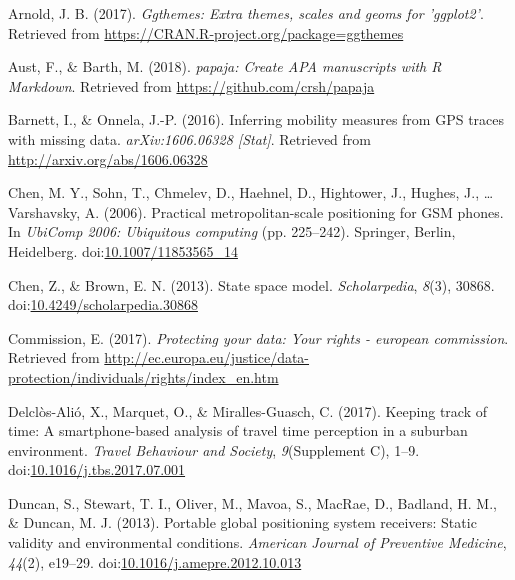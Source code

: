 \documentclass[man]{apa6}
\theoremstyle{definition}
\theoremstyle{definition}
\theoremstyle{definition}
\theoremstyle{remark}
\begin{document}
\begingroup
\setlength{\parindent}{-0.5in} \setlength{\leftskip}{0.5in}

\hypertarget{refs}{}
\hypertarget{ref-R-ggthemes}{}
Arnold, J. B. (2017). \emph{Ggthemes: Extra themes, scales and geoms for
'ggplot2'}. Retrieved from
\url{https://CRAN.R-project.org/package=ggthemes}

\hypertarget{ref-R-papaja}{}
Aust, F., \& Barth, M. (2018). \emph{papaja: Create APA manuscripts with
R Markdown}. Retrieved from \url{https://github.com/crsh/papaja}

\hypertarget{ref-barnett_inferring_2016}{}
Barnett, I., \& Onnela, J.-P. (2016). Inferring mobility measures from
GPS traces with missing data. \emph{arXiv:1606.06328 {[}Stat{]}}.
Retrieved from \url{http://arxiv.org/abs/1606.06328}

\hypertarget{ref-chen_practical_2006}{}
Chen, M. Y., Sohn, T., Chmelev, D., Haehnel, D., Hightower, J., Hughes,
J., \ldots{} Varshavsky, A. (2006). Practical metropolitan-scale
positioning for GSM phones. In \emph{UbiComp 2006: Ubiquitous computing}
(pp. 225--242). Springer, Berlin, Heidelberg.
doi:\href{https://doi.org/10.1007/11853565_14}{10.1007/11853565\_14}

\hypertarget{ref-chen_state_2013}{}
Chen, Z., \& Brown, E. N. (2013). State space model.
\emph{Scholarpedia}, \emph{8}(3), 30868.
doi:\href{https://doi.org/10.4249/scholarpedia.30868}{10.4249/scholarpedia.30868}

\hypertarget{ref-commission_protecting_2017}{}
Commission, E. (2017). \emph{Protecting your data: Your rights -
european commission}. Retrieved from
\url{http://ec.europa.eu/justice/data-protection/individuals/rights/index_en.htm}

\hypertarget{ref-delclos-alio_keeping_2017}{}
Delclòs-Alió, X., Marquet, O., \& Miralles-Guasch, C. (2017). Keeping
track of time: A smartphone-based analysis of travel time perception in
a suburban environment. \emph{Travel Behaviour and Society},
\emph{9}(Supplement C), 1--9.
doi:\href{https://doi.org/10.1016/j.tbs.2017.07.001}{10.1016/j.tbs.2017.07.001}

\hypertarget{ref-duncan_portable_2013}{}
Duncan, S., Stewart, T. I., Oliver, M., Mavoa, S., MacRae, D., Badland,
H. M., \& Duncan, M. J. (2013). Portable global positioning system
receivers: Static validity and environmental conditions. \emph{American
Journal of Preventive Medicine}, \emph{44}(2), e19--29.
doi:\href{https://doi.org/10.1016/j.amepre.2012.10.013}{10.1016/j.amepre.2012.10.013}
\end{document}
